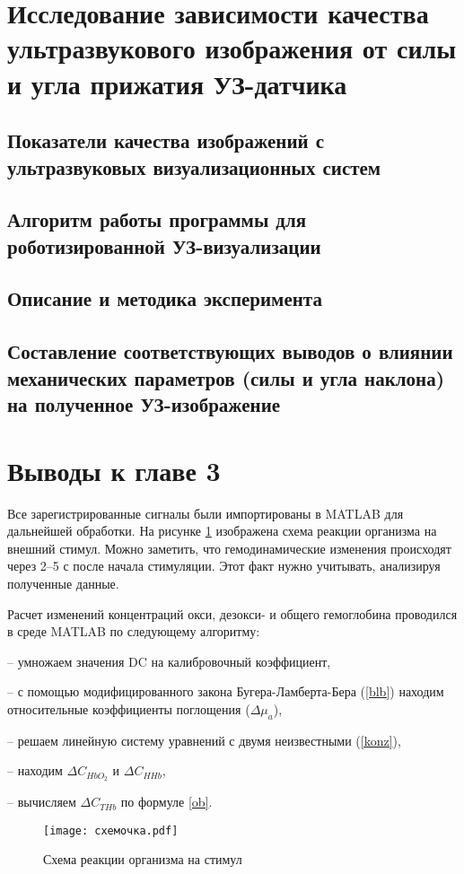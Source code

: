 \section{Исследование зависимости качества ультразвукового изображения от силы и угла прижатия УЗ-датчика}
\subsection{Показатели качества изображений с ультразвуковых визуализационных систем}
\subsection{Алгоритм работы программы для роботизированной УЗ-визуализации}
\subsection{Описание и методика эксперимента}
\subsection{Составление соответствующих выводов о влиянии механических параметров (силы и угла наклона) на полученное УЗ-изображение}

\section{Выводы к главе 3}
Все зарегистрированные сигналы были импортированы в MATLAB для дальнейшей обработки. На рисунке \ref{45} изображена схема реакции организма на внешний стимул. Можно заметить, что гемодинамические изменения происходят через 2–5 с после начала стимуляции. Этот факт нужно учитывать, анализируя полученные данные.

Расчет изменений концентраций окси, дезокси- и общего гемоглобина проводился в среде MATLAB по следующему алгоритму:

– умножаем значения DC на калибровочный коэффициент,
    
– с помощью модифицированного закона Бугера-Ламберта-Бера (\ref{blb}) находим относительные коэффициенты поглощения ($\Delta \mu_a$),

– решаем линейную систему уравнений с двумя неизвестными (\ref{konz}),

– находим $\Delta C_{HbO_2}$ и $\Delta C_{HHb}$,

– вычисляем $\Delta C_{THb}$ по формуле \ref{ob}.

\begin{figure}[!h]
\begin{center}
\texttt{[image: схемочка.pdf]}
\caption{\centering Схема реакции организма на стимул}
\label{45}
\end{center}
\end{figure}

